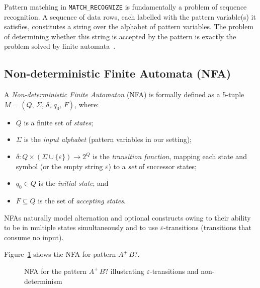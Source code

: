 Pattern matching in \texttt{MATCH\_RECOGNIZE} is fundamentally a
problem of sequence recognition.  A sequence of data rows, each
labelled with the pattern variable(s) it satisfies, constitutes a
string over the alphabet of pattern variables.  The problem of
determining whether this string is accepted by the pattern is
exactly the problem solved by finite automata~\cite{HopcroftUllman}.

\subsection{Non-deterministic Finite Automata (NFA)}
\label{subsec:meth-nfa}

A \emph{Non-deterministic Finite Automaton} (NFA) is formally
defined as a 5-tuple $M = (Q,\,\Sigma,\,\delta,\,q_0,\,F)$, where:

\begin{itemize}
  \item $Q$ is a finite set of \emph{states};
  \item $\Sigma$ is the \emph{input alphabet} (pattern variables in
    our setting);
  \item $\delta : Q \times (\Sigma \cup \{\varepsilon\}) \to 2^{Q}$
    is the \emph{transition function}, mapping each state and symbol
    (or the empty string $\varepsilon$) to a \emph{set} of successor
    states;
  \item $q_0 \in Q$ is the \emph{initial state}; and
  \item $F \subseteq Q$ is the set of \emph{accepting states}.
\end{itemize}

NFAs naturally model alternation and optional constructs owing to
their ability to be in multiple states simultaneously and to use
$\varepsilon$-transitions (transitions that consume no input).

Figure~\ref{fig:meth-nfa} shows the NFA for pattern $A^{+}\,B?$.

\begin{figure}[htbp]
  \centering
  \caption{NFA for the pattern $A^{+}\,B?$ illustrating
    $\varepsilon$-transitions and non-determinism}
  \label{fig:meth-nfa}
\end{figure}

